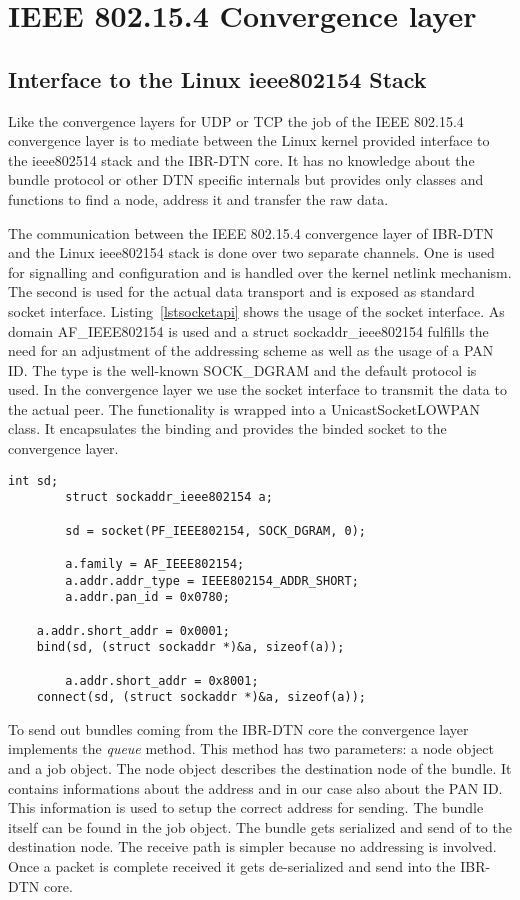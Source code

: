 \chapter{IEEE 802.15.4 Convergence layer}
\label{802154layer}
\section{Interface to the Linux ieee802154 Stack}

Like the convergence layers for UDP or TCP the job of the IEEE 802.15.4
convergence layer is to mediate between the Linux kernel provided interface
to the ieee802514 stack and the IBR-DTN core. It has no knowledge about the
bundle protocol or other DTN specific internals but provides only classes and
functions to find a node, address it and transfer the raw data.

The communication between the IEEE 802.15.4 convergence layer of IBR-DTN and the
Linux ieee802154 stack is done over two separate channels. One is used for
signalling and configuration and is handled over the kernel netlink mechanism.
The second is used for the actual data transport and is exposed as standard
socket interface. Listing~\ref{lstsocketapi} shows the usage of the socket interface.
As domain AF\_IEEE802154 is used and a struct sockaddr\_ieee802154 fulfills the
need for an adjustment of the addressing scheme as well as the usage of a PAN
ID. The type is the well-known SOCK\_DGRAM and the default protocol is used. In the
convergence layer we use the socket interface to transmit the data to the actual
peer. The functionality is wrapped into a UnicastSocketLOWPAN class. It
encapsulates the binding and provides the binded socket to the convergence
layer.

\begin{lstlisting}[caption= ieee802154 socket interface, label=lstsocketapi]
        int sd;
        struct sockaddr_ieee802154 a;

        sd = socket(PF_IEEE802154, SOCK_DGRAM, 0);

        a.family = AF_IEEE802154;
        a.addr.addr_type = IEEE802154_ADDR_SHORT;
        a.addr.pan_id = 0x0780;

	a.addr.short_addr = 0x0001;
	bind(sd, (struct sockaddr *)&a, sizeof(a));

        a.addr.short_addr = 0x8001;
	connect(sd, (struct sockaddr *)&a, sizeof(a));
\end{lstlisting}

To send out bundles coming from the IBR-DTN core the convergence layer implements
the \emph{queue} method. This method has two parameters: a node object and a job
object. The node object describes the destination node of the bundle. It
contains informations about the address and in our case also about the PAN ID.
This information is used to setup the correct address for sending. The bundle
itself can be found in the job object. The bundle gets serialized and send of
to the destination node. The receive path is simpler because no addressing
is involved. Once a packet is complete received it gets de-serialized and send
into the IBR-DTN core.

